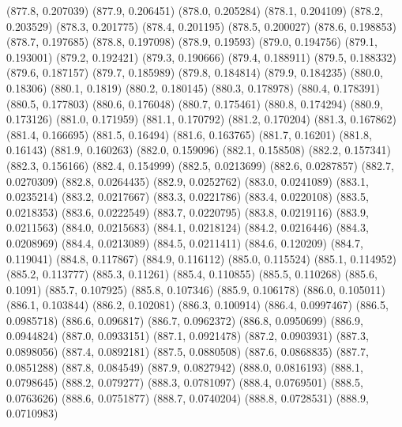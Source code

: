 {					(877.8, 0.207039)
					(877.9, 0.206451)
					(878.0, 0.205284)
					(878.1, 0.204109)
					(878.2, 0.203529)
					(878.3, 0.201775)
					(878.4, 0.201195)
					(878.5, 0.200027)
					(878.6, 0.198853)
					(878.7, 0.197685)
					(878.8, 0.197098)
					(878.9, 0.19593)
					(879.0, 0.194756)
					(879.1, 0.193001)
					(879.2, 0.192421)
					(879.3, 0.190666)
					(879.4, 0.188911)
					(879.5, 0.188332)
					(879.6, 0.187157)
					(879.7, 0.185989)
					(879.8, 0.184814)
					(879.9, 0.184235)
					(880.0, 0.18306)
					(880.1, 0.1819)
					(880.2, 0.180145)
					(880.3, 0.178978)
					(880.4, 0.178391)
					(880.5, 0.177803)
					(880.6, 0.176048)
					(880.7, 0.175461)
					(880.8, 0.174294)
					(880.9, 0.173126)
					(881.0, 0.171959)
					(881.1, 0.170792)
					(881.2, 0.170204)
					(881.3, 0.167862)
					(881.4, 0.166695)
					(881.5, 0.16494)
					(881.6, 0.163765)
					(881.7, 0.16201)
					(881.8, 0.16143)
					(881.9, 0.160263)
					(882.0, 0.159096)
					(882.1, 0.158508)
					(882.2, 0.157341)
					(882.3, 0.156166)
					(882.4, 0.154999)
					(882.5, 0.0213699)
					(882.6, 0.0287857)
					(882.7, 0.0270309)
					(882.8, 0.0264435)
					(882.9, 0.0252762)
					(883.0, 0.0241089)
					(883.1, 0.0235214)
					(883.2, 0.0217667)
					(883.3, 0.0221786)
					(883.4, 0.0220108)
					(883.5, 0.0218353)
					(883.6, 0.0222549)
					(883.7, 0.0220795)
					(883.8, 0.0219116)
					(883.9, 0.0211563)
					(884.0, 0.0215683)
					(884.1, 0.0218124)
					(884.2, 0.0216446)
					(884.3, 0.0208969)
					(884.4, 0.0213089)
					(884.5, 0.0211411)
					(884.6, 0.120209)
					(884.7, 0.119041)
					(884.8, 0.117867)
					(884.9, 0.116112)
					(885.0, 0.115524)
					(885.1, 0.114952)
					(885.2, 0.113777)
					(885.3, 0.11261)
					(885.4, 0.110855)
					(885.5, 0.110268)
					(885.6, 0.1091)
					(885.7, 0.107925)
					(885.8, 0.107346)
					(885.9, 0.106178)
					(886.0, 0.105011)
					(886.1, 0.103844)
					(886.2, 0.102081)
					(886.3, 0.100914)
					(886.4, 0.0997467)
					(886.5, 0.0985718)
					(886.6, 0.096817)
					(886.7, 0.0962372)
					(886.8, 0.0950699)
					(886.9, 0.0944824)
					(887.0, 0.0933151)
					(887.1, 0.0921478)
					(887.2, 0.0903931)
					(887.3, 0.0898056)
					(887.4, 0.0892181)
					(887.5, 0.0880508)
					(887.6, 0.0868835)
					(887.7, 0.0851288)
					(887.8, 0.084549)
					(887.9, 0.0827942)
					(888.0, 0.0816193)
					(888.1, 0.0798645)
					(888.2, 0.079277)
					(888.3, 0.0781097)
					(888.4, 0.0769501)
					(888.5, 0.0763626)
					(888.6, 0.0751877)
					(888.7, 0.0740204)
					(888.8, 0.0728531)
					(888.9, 0.0710983)
}
